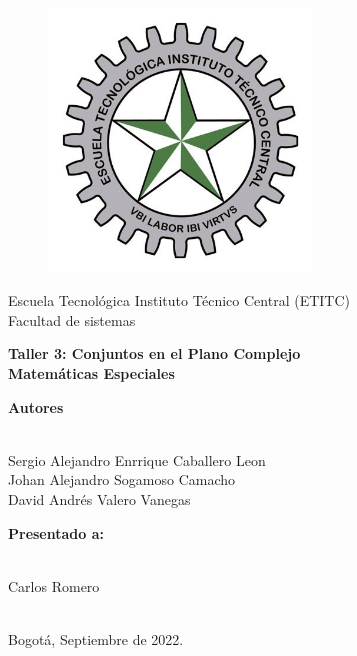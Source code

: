 \documentclass[a4paper,11pt,openany]{book}
\begin{document}
\begin{titlepage}
 
\begin{center}
\vspace*{-1in}
\begin{figure}[htb]
\begin{center}
\includegraphics[width=7cm]{ETITC.png}
\end{center}
\end{figure}
 
 
{\sc \huge Escuela Tecnológica Instituto Técnico Central (ETITC)}\\
\vspace*{0.15in}
Facultad de sistemas\\
\vspace*{0.6in}
\begin{Large}
\textbf{Taller 3: Conjuntos en el Plano Complejo} \\
\textbf{Matem{\'a}ticas Especiales}\\
\end{Large}
\vspace*{0.3in}
\begin{large}
{\bf Autores} \\
 
\ 
 
Sergio Alejandro Enrrique Caballero Leon\\ 
Johan Alejandro Sogamoso Camacho \\
David Andrés Valero Vanegas \\
\end{large}
\vspace*{0.3in}
 
\end{center}
 
\begin{center}
{\bf Presentado a:} \\
 
\ 
 
Carlos Romero \\
 
\
 
Bogot{\'a}, Septiembre de 2022.
\end{center}
 
\end{titlepage}
\end{document}
